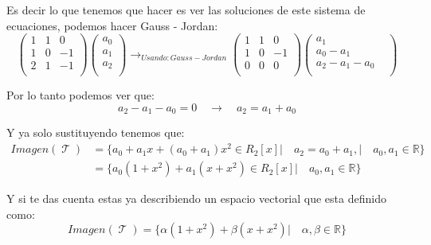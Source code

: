 \documentclass[12pt]{report}                                %
\DeclareMathOperator \LinealTransformation {\mathcal{T}}
\begin{document}
            Es decir lo que tenemos que hacer es ver las soluciones de
            este sistema de ecuaciones, podemos hacer Gauss - Jordan:
            \begin{equation*}
                \begin{pmatrix} 1&1&0 \\ 1&0&-1 \\ 2&1&-1 \\\end{pmatrix} 
                \begin{pmatrix} a_0 \\ a_1 \\ a_2 \\\end{pmatrix}
                \to_{Usando: Gauss-Jordan}
                \begin{pmatrix} 1&1&0 \\ 1&0&-1 \\ 0&0&0 \\\end{pmatrix}
                \begin{pmatrix} a_1 & \\ a_0-a_1 &\\ a_2-a_1-a_0 &\\\end{pmatrix}
            \end{equation*}

            Por lo tanto podemos ver que:
            \begin{equation*}
                a_2-a_1-a_0 = 0
                \quad \to \quad
                a_2 = a_1 + a_0
            \end{equation*}

            Y ya solo sustituyendo tenemos que:
            \begin{equation*}
            \begin{split}
                Imagen(\LinealTransformation) 
                & = \{a_0+a_1x+(a_0+a_1)x^2 \in R_2[x] |\quad a_2 = a_0 + a_1, |\quad a_0, a_1 \in \mathbb{R}\}  \\
                & = \{a_0(1+x^2) +a_1(x+x^2) \in R_2[x] |\quad a_0, a_1 \in \mathbb{R}\}
            \end{split}
            \end{equation*}

            Y si te das cuenta estas ya describiendo un espacio vectorial que esta definido como:
            \begin{equation*}
                Imagen(\LinealTransformation) = \{\alpha(1+x^2) + \beta(x+x^2) |\quad \alpha, \beta \in \mathbb{R}\}
            \end{equation*}
\end{document}
